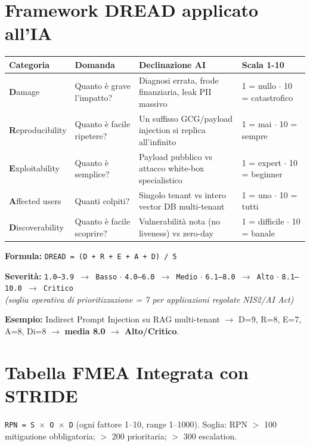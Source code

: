 \documentclass[11pt, a4paper]{article}
\begin{document}
\section{Framework DREAD applicato all'IA}

\noindent
\begin{tabularx}{\textwidth}{|l|l|X|l|}
\hline
\textbf{Categoria} & \textbf{Domanda} & \textbf{Declinazione AI} & \textbf{Scala 1-10} \\ \hline
\textbf{D}amage & Quanto è grave l'impatto? & Diagnosi errata, frode finanziaria, leak PII massivo & 1 = nullo $\cdot$ 10 = catastrofico \\ \hline
\textbf{R}eproducibility & Quanto è facile ripetere? & Un suffisso GCG/payload injection si replica all'infinito & 1 = mai $\cdot$ 10 = sempre \\ \hline
\textbf{E}xploitability & Quanto è semplice? & Payload pubblico vs attacco white-box specialistico & 1 = expert $\cdot$ 10 = beginner \\ \hline
\textbf{A}ffected users & Quanti colpiti? & Singolo tenant vs intero vector DB multi-tenant & 1 = uno $\cdot$ 10 = tutti \\ \hline
\textbf{D}iscoverability & Quanto è facile scoprire? & Vulnerabilità nota (no liveness) vs zero-day & 1 = difficile $\cdot$ 10 = banale \\ \hline
\end{tabularx}

\vspace{0.3cm}
\textbf{Formula:} \texttt{DREAD = (D + R + E + A + D) / 5}

\textbf{Severità:} \texttt{1.0--3.9 $\rightarrow$ Basso} $\cdot$ \texttt{4.0--6.0 $\rightarrow$ Medio} $\cdot$ \texttt{6.1--8.0 $\rightarrow$ Alto} $\cdot$ \texttt{8.1--10.0 $\rightarrow$ Critico} \\
\emph{(soglia operativa di prioritizzazione = 7 per applicazioni regolate NIS2/AI Act)}

\textbf{Esempio:} Indirect Prompt Injection su RAG multi-tenant $\rightarrow$ D=9, R=8, E=7, A=8, Di=8 $\rightarrow$ \textbf{media 8.0 $\rightarrow$ Alto/Critico}.

\section{Tabella FMEA Integrata con STRIDE}

\texttt{RPN = S $\times$ O $\times$ D} (ogni fattore 1--10, range 1--1000). Soglia: RPN $>$ 100 mitigazione obbligatoria; $>$ 200 prioritaria; $>$ 300 escalation.
\end{document}
